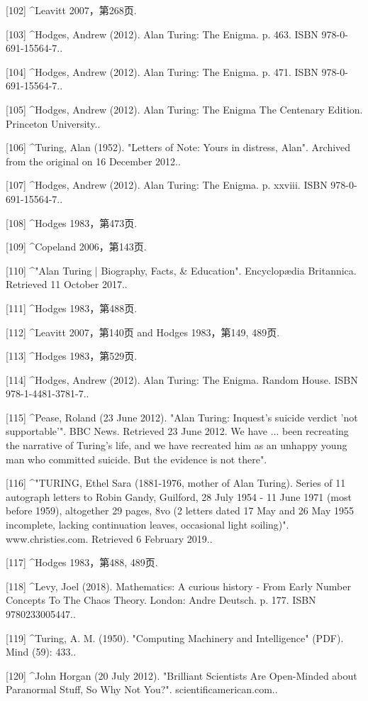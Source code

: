 [102]
^Leavitt 2007，第268页.

[103]
^Hodges, Andrew (2012). Alan Turing: The Enigma. p. 463. ISBN 978-0-691-15564-7..

[104]
^Hodges, Andrew (2012). Alan Turing: The Enigma. p. 471. ISBN 978-0-691-15564-7..

[105]
^Hodges, Andrew (2012). Alan Turing: The Enigma The Centenary Edition. Princeton University..

[106]
^Turing, Alan (1952). "Letters of Note: Yours in distress, Alan". Archived from the original on 16 December 2012..

[107]
^Hodges, Andrew (2012). Alan Turing: The Enigma. p. xxviii. ISBN 978-0-691-15564-7..

[108]
^Hodges 1983，第473页.

[109]
^Copeland 2006，第143页.

[110]
^"Alan Turing | Biography, Facts, & Education". Encyclopædia Britannica. Retrieved 11 October 2017..

[111]
^Hodges 1983，第488页.

[112]
^Leavitt 2007，第140页 and Hodges 1983，第149, 489页.

[113]
^Hodges 1983，第529页.

[114]
^Hodges, Andrew (2012). Alan Turing: The Enigma. Random House. ISBN 978-1-4481-3781-7..

[115]
^Pease, Roland (23 June 2012). "Alan Turing: Inquest's suicide verdict 'not supportable'". BBC News. Retrieved 23 June 2012. We have ... been recreating the narrative of Turing's life, and we have recreated him as an unhappy young man who committed suicide. But the evidence is not there".

[116]
^"TURING, Ethel Sara (1881-1976, mother of Alan Turing). Series of 11 autograph letters to Robin Gandy, Guilford, 28 July 1954 - 11 June 1971 (most before 1959), altogether 29 pages, 8vo (2 letters dated 17 May and 26 May 1955 incomplete, lacking continuation leaves, occasional light soiling)". www.christies.com. Retrieved 6 February 2019..

[117]
^Hodges 1983，第488, 489页.

[118]
^Levy, Joel (2018). Mathematics: A curious history - From Early Number Concepts To The Chaos Theory. London: Andre Deutsch. p. 177. ISBN 9780233005447..

[119]
^Turing, A. M. (1950). "Computing Machinery and Intelligence" (PDF). Mind (59): 433..

[120]
^John Horgan (20 July 2012). "Brilliant Scientists Are Open-Minded about Paranormal Stuff, So Why Not You?". scientificamerican.com..

